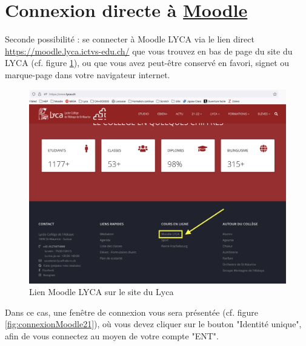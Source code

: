 \documentclass[10pt,a4paper]{report}
\begin{document}
	
	\section{Connexion directe à \href{https://moodle.lyca.ictvs-edu.ch/}{Moodle}}
	
	Seconde possibilité : se connecter à Moodle LYCA via le lien direct\\ \href{https://moodle.lyca.ictvs-edu.ch/}{https://moodle.lyca.ictvs-edu.ch/} que vous trouvez en bas de page du site du LYCA (cf. figure \ref{fig:siteLycaLienMoodle}), ou que vous avez peut-être conservé en favori, signet ou marque-page dans votre navigateur internet.
	
	\begin{figure}[H]
		\centering
		\includegraphics[width=0.8\linewidth]{images/capture_site_lyca_lien_moodle}
		\caption{Lien Moodle LYCA sur le site du Lyca}
		\label{fig:siteLycaLienMoodle}
	\end{figure}
	
	\newpage
	
	
	Dans ce cas, une fenêtre de connexion vous sera présentée (cf. figure \ref{fig:connexionMoodle21}), où vous devez cliquer sur le bouton "Identité unique", afin de vous connectez au moyen de votre compte "ENT".
	
\end{document}
